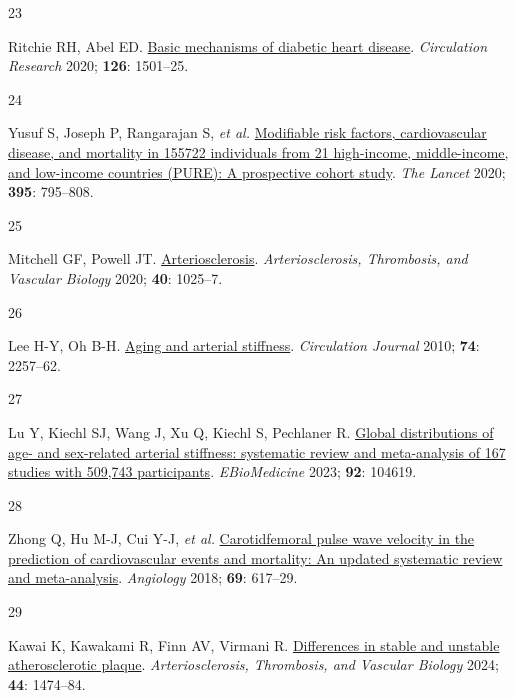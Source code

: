 \documentclass[
  a4paper,
  headsepline=true,
  open=any]{scrbook}
\newlength{\cslhangindent}
\newlength{\csllabelwidth}
\newlength{\cslentryspacingunit} %
\newenvironment{CSLReferences}[2] %
 {%
  \setlength{\parindent}{0pt}
  \ifodd #1
  \let\oldpar\par
  \def\par{\hangindent=\cslhangindent\oldpar}
  \fi
  \setlength{\parskip}{#2\cslentryspacingunit}
 }%
 {}
\newcommand{\CSLLeftMargin}[1]{\parbox[t]{\csllabelwidth}{#1}}
\newcommand{\CSLRightInline}[1]{\parbox[t]{\linewidth - \csllabelwidth}{#1}\break}
\begin{document}
\begin{CSLReferences}{0}{0}
\leavevmode{}%
\CSLLeftMargin{23 }%
\CSLRightInline{Ritchie RH, Abel ED.
\href{https://doi.org/10.1161/CIRCRESAHA.120.315913}{Basic mechanisms of
diabetic heart disease}. \emph{Circulation Research} 2020; \textbf{126}:
1501--25.}

\leavevmode{}%
\CSLLeftMargin{24 }%
\CSLRightInline{Yusuf S, Joseph P, Rangarajan S, \emph{et al.}
\href{https://doi.org/10.1016/S0140-6736(19)32008-2}{Modifiable risk
factors, cardiovascular disease, and mortality in 155{\hphantom{,}}722
individuals from 21 high-income, middle-income, and low-income countries
(PURE): A prospective cohort study}. \emph{The Lancet} 2020;
\textbf{395}: 795--808.}

\leavevmode{}%
\CSLLeftMargin{25 }%
\CSLRightInline{Mitchell GF, Powell JT.
\href{https://doi.org/10.1161/ATVBAHA.120.314208}{Arteriosclerosis}.
\emph{Arteriosclerosis, Thrombosis, and Vascular Biology} 2020;
\textbf{40}: 1025--7.}

\leavevmode{}%
\CSLLeftMargin{26 }%
\CSLRightInline{Lee H-Y, Oh B-H.
\href{https://doi.org/10.1253/circj.CJ-10-0910}{Aging and arterial
stiffness}. \emph{Circulation Journal} 2010; \textbf{74}: 2257--62.}

\leavevmode{}%
\CSLLeftMargin{27 }%
\CSLRightInline{Lu Y, Kiechl SJ, Wang J, Xu Q, Kiechl S, Pechlaner R.
\href{https://doi.org/10.1016/j.ebiom.2023.104619}{Global distributions
of age- and sex-related arterial stiffness: systematic review and
meta-analysis of 167 studies with 509,743 participants}.
\emph{EBioMedicine} 2023; \textbf{92}: 104619.}

\leavevmode{}%
\CSLLeftMargin{28 }%
\CSLRightInline{Zhong Q, Hu M-J, Cui Y-J, \emph{et al.}
\href{https://doi.org/10.1177/0003319717742544}{Carotid{\textendash}femoral
pulse wave velocity in the prediction of cardiovascular events and
mortality: An updated systematic review and meta-analysis}.
\emph{Angiology} 2018; \textbf{69}: 617--29.}

\leavevmode{}%
\CSLLeftMargin{29 }%
\CSLRightInline{Kawai K, Kawakami R, Finn AV, Virmani R.
\href{https://doi.org/10.1161/ATVBAHA.124.319396}{Differences in stable
and unstable atherosclerotic plaque}. \emph{Arteriosclerosis,
Thrombosis, and Vascular Biology} 2024; \textbf{44}: 1474--84.}


\end{CSLReferences}
\end{document}
